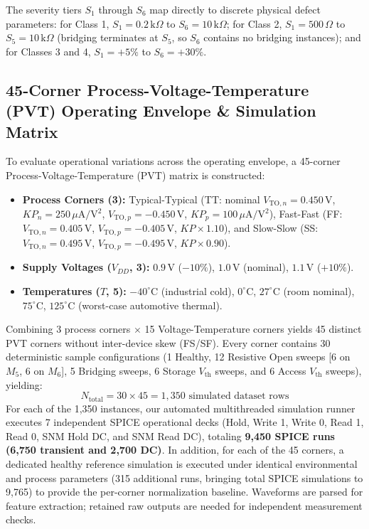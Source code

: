 \documentclass[conference]{IEEEtran}
\begin{document}
The severity tiers $S_1$ through $S_6$ map directly to discrete physical defect parameters: for Class 1, $S_1=0.2\,\text{k}\Omega$ to $S_6=10\,\text{k}\Omega$; for Class 2, $S_1=500\,\Omega$ to $S_5=10\,\text{k}\Omega$ (bridging terminates at $S_5$, so $S_6$ contains no bridging instances); and for Classes 3 and 4, $S_1=+5\%$ to $S_6=+30\%$.

\subsection{45-Corner Process-Voltage-Temperature (PVT) Operating Envelope \& Simulation Matrix}
To evaluate operational variations across the operating envelope, a 45-corner Process-Voltage-Temperature (PVT) matrix is constructed:
\begin{itemize}
    \item \textbf{Process Corners (3):} Typical-Typical (TT: nominal $V_{\text{TO},n} = 0.450\,\text{V}$, $KP_n = 250\,\mu\text{A}/\text{V}^2$, $V_{\text{TO},p} = -0.450\,\text{V}$, $KP_p = 100\,\mu\text{A}/\text{V}^2$), Fast-Fast (FF: $V_{\text{TO},n} = 0.405\,\text{V}$, $V_{\text{TO},p} = -0.405\,\text{V}$, $KP \times 1.10$), and Slow-Slow (SS: $V_{\text{TO},n} = 0.495\,\text{V}$, $V_{\text{TO},p} = -0.495\,\text{V}$, $KP \times 0.90$).
    \item \textbf{Supply Voltages ($V_{DD}$, 3):} $0.9\,\text{V}$ ($-10\%$), $1.0\,\text{V}$ (nominal), $1.1\,\text{V}$ ($+10\%$).
    \item \textbf{Temperatures ($T$, 5):} $-40^\circ\text{C}$ (industrial cold), $0^\circ\text{C}$, $27^\circ\text{C}$ (room nominal), $75^\circ\text{C}$, $125^\circ\text{C}$ (worst-case automotive thermal).
\end{itemize}
Combining 3 process corners $\times$ 15 Voltage-Temperature corners yields 45 distinct PVT corners without inter-device skew (FS/SF). Every corner contains 30 deterministic sample configurations (1 Healthy, 12 Resistive Open sweeps [6 on $M_5$, 6 on $M_6$], 5 Bridging sweeps, 6 Storage $V_{\text{th}}$ sweeps, and 6 Access $V_{\text{th}}$ sweeps), yielding:
\begin{equation}
N_{\text{total}} = 30 \times 45 = 1{,}350 \text{ simulated dataset rows}
\end{equation}
For each of the 1,350 instances, our automated multithreaded simulation runner executes 7 independent SPICE operational decks (Hold, Write 1, Write 0, Read 1, Read 0, SNM Hold DC, and SNM Read DC), totaling \textbf{9,450 SPICE runs (6,750 transient and 2,700 DC)}. In addition, for each of the 45 corners, a dedicated healthy reference simulation is executed under identical environmental and process parameters (315 additional runs, bringing total SPICE simulations to 9,765) to provide the per-corner normalization baseline. Waveforms are parsed for feature extraction; retained raw outputs are needed for independent measurement checks.
\end{document}
